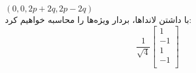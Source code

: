 $(0, 0, 2p + 2q, 2p - 2q)$
\\
با داشتن لانداها، بردار ویژه‌ها را محاسبه خواهیم کرد:
\\
$$\frac{1}{\sqrt{4}}
\begin{bmatrix}
 1 \\
-1 \\
 1 \\
-1 \\ 
\end{bmatrix}$$

\\